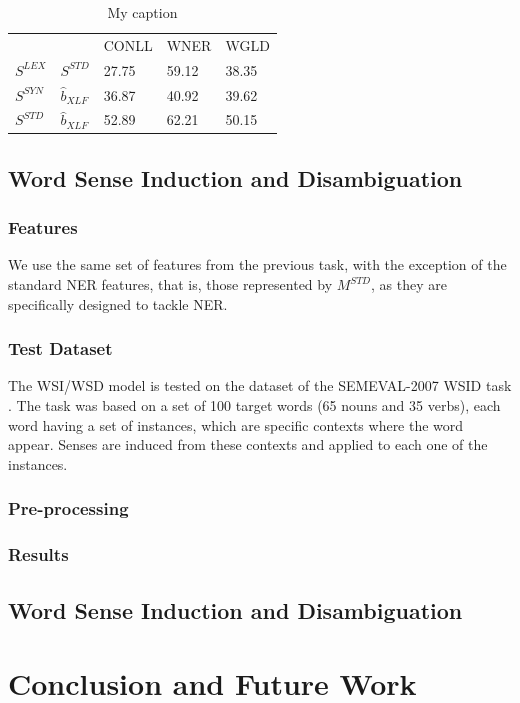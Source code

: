 \documentclass{llncs}
\begin{document}
\begin{table}[h]
\begin{tabular}{@{}lllll@{}}
\midrule
          &           & CONLL                      & WNER                      & WGLD                      \\ \cmidrule{3-5}
$S^{LEX}$ & $S^{STD}$ & 27.75                      & 59.12                     & 38.35                     \\
$S^{SYN}$ & $\hat{b}_{\scriptscriptstyle XLF}$       & 36.87                      & 40.92                     & 39.62                     \\
$S^{STD}$ & $\hat{b}_{\scriptscriptstyle XLF}$        & 52.89                      & 62.21                     & 50.15                     \\ \bottomrule
\end{tabular}
\caption{My caption}
\end{table}

\subsection{Word Sense Induction and Disambiguation}
\subsubsection{Features}
We use the same set of features from the previous task, with the exception of the standard NER features, that is, those represented by $M^{STD}$, as they are specifically designed to tackle NER.

\subsubsection{Test Dataset}
The WSI/WSD model is tested on the dataset of  the SEMEVAL-2007 WSID task \cite{Agirre2007}. The task was based on a set of 100 target words (65 nouns and 35 verbs), each  word having a set of instances, which are specific contexts where the word appear. Senses are induced from these contexts and applied to each one of the instances.
\subsubsection{Pre-processing}

\subsubsection{Results}
%
%
%
\subsection{Word Sense Induction and Disambiguation}


\section{Conclusion and Future Work}




\end{document}
